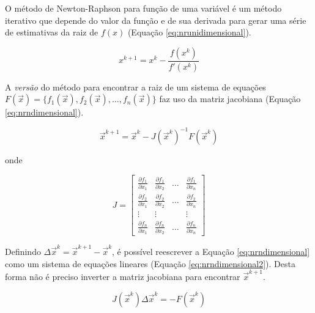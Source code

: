 \documentclass[final,5p]{elsarticle}
\numberwithin{equation}{section}
\begin{document}
        O método de Newton-Raphson para função de uma variável é um método iterativo que depende do valor da função e de sua derivada para gerar uma série de estimativas da raiz de $f(x)$ (Equação \ref{eq:nrunidimensional}).

        \begin{equation}
            x^{k+1} = x^{k} - \frac{f(x^k)}{f'(x^k)} \label{eq:nrunidimensional}
        \end{equation}

        A \emph{versão} do método para encontrar a raiz de um sistema de equações $F(\vec{x}) = \{f_1(\vec{x}), f_2(\vec{x}), \ldots, f_n(\vec{x})\}$ faz uso da matriz jacobiana (Equação \ref{eq:nrndimensional})\cite{burden2016analise}.

        \begin{equation}
            \vec{x}^{k+1} = \vec{x}^{k} - J(\vec{x}^k)^{-1}F(\vec{x}^k) \label{eq:nrndimensional}
        \end{equation}

        \noindent onde

        \begin{equation}
            J =
            \begin{bmatrix}
                \frac{\partial f_1}{\partial x_1} & \frac{\partial f_1}{\partial x_2} & \ldots & \frac{\partial f_1}{\partial x_n} \\
                \frac{\partial f_2}{\partial x_1} & \frac{\partial f_2}{\partial x_2} & \ldots & \frac{\partial f_2}{\partial x_n} \\
                \vdots     & \vdots     &        & \vdots  \\
                \frac{\partial f_n}{\partial x_1} & \frac{\partial f_n}{\partial x_2} & \ldots & \frac{\partial f_n}{\partial x_n}
            \end{bmatrix}
            \label{eq:jacobiano}
        \end{equation}

        Definindo $\Delta \vec{x}^{k} = \vec{x}^{k+1} - \vec{x}^{k}$, é possível reescrever a Equação \ref{eq:nrndimensional} como um sistema de equações lineares (Equação \ref{eq:nrndimensional2}). Desta forma não é preciso inverter a matriz jacobiana para encontrar $\vec{x}^{k+1}$.

        \begin{equation}
            J(\vec{x}^k) \Delta \vec{x}^{k} = -F(\vec{x}^k) \label{eq:nrndimensional2}
        \end{equation}
\end{document}
